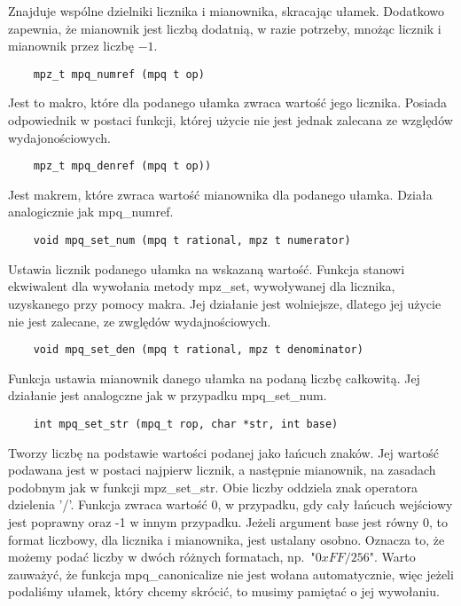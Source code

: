 \documentclass[oneside,a4paper]{book}
\begin{document}
	Znajduje wspólne dzielniki licznika i mianownika, skracając ułamek. Dodatkowo zapewnia, że mianownik jest liczbą dodatnią, w razie potrzeby, mnożąc licznik i mianownik przez liczbę $-1$.
	
	\begin{lstlisting}
	mpz_t mpq_numref (mpq t op)
	\end{lstlisting}
	
	Jest to makro, które dla podanego ułamka zwraca wartość jego licznika. Posiada odpowiednik w postaci funkcji, której użycie nie jest jednak zalecana ze względów wydajonościowych.
	
	\begin{lstlisting}
	mpz_t mpq_denref (mpq t op))
	\end{lstlisting}
	
	Jest makrem, które zwraca wartość mianownika dla podanego ułamka. Działa analogicznie jak mpq\_numref.
	
	\begin{lstlisting}
	void mpq_set_num (mpq t rational, mpz t numerator)
	\end{lstlisting}
	
	Ustawia licznik podanego ułamka na wskazaną wartość. Funkcja stanowi ekwiwalent dla wywołania metody mpz\_set, wywoływanej dla licznika, uzyskanego przy pomocy makra. Jej działanie jest wolniejsze, dlatego jej użycie nie jest zalecane, ze zwględów wydajnościowych.
	
	\begin{lstlisting}
	void mpq_set_den (mpq t rational, mpz t denominator)
	\end{lstlisting}
	Funkcja ustawia mianownik danego ułamka na podaną liczbę całkowitą. Jej działanie jest analogczne jak w przypadku mpq\_set\_num.
	
	\begin{lstlisting}
	int mpq_set_str (mpq_t rop, char *str, int base)
	\end{lstlisting}
	
	Tworzy liczbę na podstawie wartości podanej jako łańcuch znaków. Jej wartość podawana jest w postaci najpierw licznik, a następnie mianownik, na zasadach podobnym jak w funkcji mpz\_set\_str. Obie liczby oddziela znak operatora dzielenia '/'. Funkcja zwraca wartość $0$, w przypadku, gdy cały łańcuch wejściowy jest poprawny oraz -1 w innym przypadku. Jeżeli argument base jest równy $0$, to format liczbowy, dla licznika i mianownika, jest ustalany osobno. Oznacza to, że możemy podać liczby w dwóch różnych formatach, np.\ "$0xFF/256$". Warto zauważyć, że funkcja mpq\_canonicalize nie jest wołana automatycznie, więc jeżeli podaliśmy ułamek, który chcemy skrócić, to musimy pamiętać o jej wywołaniu.
	
\end{document}
